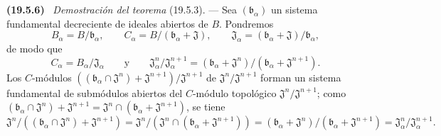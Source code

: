 \documentclass[10pt,oneside]{book}
\makeatletter
\newcommand{\setmanualcurrentlabel}[1]{\def\@currentlabel{#1}}
\newenvironment{env}[1][]{\setmanualcurrentlabel{#1}\par\medskip\noindent\textbf{(#1)}\ }{\par}
\makeatother
\begin{document}
\begin{env}[19.5.6]
\label{0.19.5.6-es}
\emph{Demostración del teorema} (19.5.3). --- Sea
$(\mathfrak b_\alpha)$ un sistema fundamental decreciente de ideales abiertos de
$B$. Pondremos
\[
  B_\alpha=B/\mathfrak b_\alpha,\qquad
  C_\alpha=B/(\mathfrak b_\alpha+\mathfrak J),\qquad
  \mathfrak J_\alpha=(\mathfrak b_\alpha+\mathfrak J)/\mathfrak b_\alpha,
\]
de modo que
\[
  C_\alpha=B_\alpha/\mathfrak J_\alpha\qquad\text{y}\qquad
  \mathfrak J_\alpha^n/\mathfrak J_\alpha^{n+1}
  =(\mathfrak b_\alpha+\mathfrak J^n)/(\mathfrak b_\alpha+\mathfrak J^{n+1}).
\]
Los $C$-módulos
$((\mathfrak b_\alpha\cap\mathfrak J^n)+\mathfrak J^{n+1})/
\mathfrak J^{n+1}$ de $\mathfrak J^n/\mathfrak J^{n+1}$ forman un sistema
fundamental de submódulos abiertos del $C$-módulo topológico
$\mathfrak J^n/\mathfrak J^{n+1}$; como
$(\mathfrak b_\alpha\cap\mathfrak J^n)+\mathfrak J^{n+1}
=\mathfrak J^n\cap(\mathfrak b_\alpha+\mathfrak J^{n+1})$, se tiene
\[
  \mathfrak J^n/((\mathfrak b_\alpha\cap\mathfrak J^n)+\mathfrak J^{n+1})
  =\mathfrak J^n/(\mathfrak J^n\cap(\mathfrak b_\alpha+\mathfrak J^{n+1}))
  =(\mathfrak b_\alpha+\mathfrak J^n)/(\mathfrak b_\alpha+\mathfrak J^{n+1})
  =\mathfrak J_\alpha^n/\mathfrak J_\alpha^{n+1}.
\]
\end{env}
\end{document}
